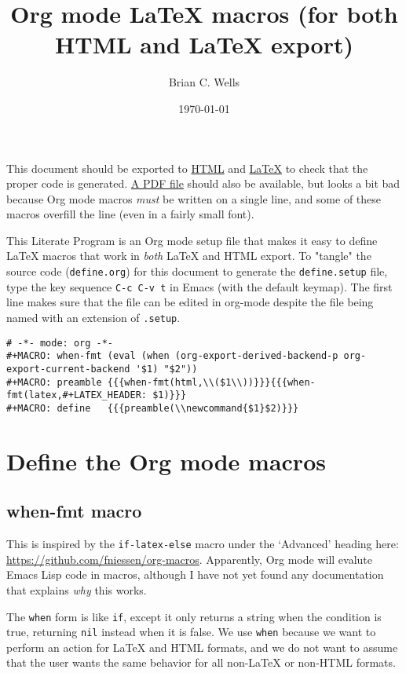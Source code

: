 \documentclass[11pt]{article}
\author{Brian C. Wells}
\date{\today}
\title{Org mode \LaTeX{} macros (for both HTML and \LaTeX{} export)}
\begin{document}
\maketitle
\tableofcontents

This document should be exported to \href{define.html}{HTML} and \href{define.tex}{\LaTeX{}} to check that the
proper code is generated.  \href{define.pdf}{A PDF file} should also be available, but
looks a bit bad because Org mode macros \emph{must} be written on a single
line, and some of these macros overfill the line (even in a fairly
small font).

This Literate Program is an Org mode setup file that makes it easy to
define \LaTeX{} macros that work in \emph{both} \LaTeX{} and HTML export.  To
"tangle" the source code (\verb~define.org~) for this document to generate
the \verb~define.setup~ file, type the key sequence \verb~C-c C-v t~ in Emacs
(with the default keymap).  The first line makes sure that the file
can be edited in org-mode despite the file being named with an
extension of \verb~.setup~.

\begin{verbatim}
# -*- mode: org -*-
#+MACRO: when-fmt (eval (when (org-export-derived-backend-p org-export-current-backend '$1) "$2"))
#+MACRO: preamble {{{when-fmt(html,\\($1\\))}}}{{{when-fmt(latex,#+LATEX_HEADER: $1)}}}
#+MACRO: define   {{{preamble(\\newcommand{$1}$2)}}}
\end{verbatim}

\section*{Define the Org mode macros}
\label{sec-1}

\subsection*{when-fmt macro}
\label{sec-1-1}

This is inspired by the \verb~if-latex-else~ macro under the `Advanced'
heading here: \url{https://github.com/fniessen/org-macros}. Apparently,
Org mode will evalute Emacs Lisp code in macros, although I have not
yet found any documentation that explains \emph{why} this works.

The \verb~when~ form is like \verb~if~, except it only returns a string when the
condition is true, returning \verb~nil~ instead when it is false.  We use
\verb~when~ because we want to perform an action for \LaTeX{} and HTML
formats, and we do not want to assume that the user wants the same
behavior for all non-\LaTeX{} or non-HTML formats.
\end{document}
